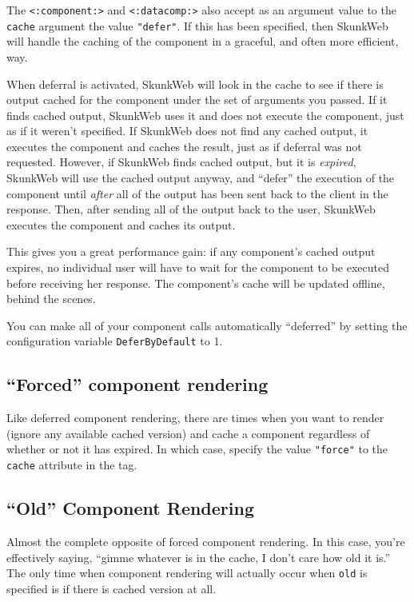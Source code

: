 \documentclass{manual}
\begin{document}
The \texttt{<:component:>} and \texttt{<:datacomp:>} also accept as an
argument value to the \texttt{cache} argument the value
\texttt{"defer"}.  If this has been specified, then SkunkWeb will
handle the caching of the component in a graceful, and often more
efficient, way.

When deferral is activated, SkunkWeb will look in the cache to see if
there is output cached for the component under the set of arguments
you passed. If it finds cached output, SkunkWeb uses it and does not
execute the component, just as if it weren't specified.  If SkunkWeb
does not find any cached output, it executes the component and caches
the result, just as if deferral was not requested. However, if
SkunkWeb finds cached output, but it is \emph{expired}, SkunkWeb will
use the cached output anyway, and ``defer'' the execution of the
component until \emph{after} all of the output has been sent back to
the client in the response.  Then, after sending all of the output
back to the user, SkunkWeb executes the component and caches its
output.

This gives you a great performance gain: if any component's cached
output expires, no individual user will have to wait for the component
to be executed before receiving her response. The component's cache
will be updated offline, behind the scenes.

You can make all of your component calls automatically ``deferred'' by
setting the configuration variable
\texttt{DeferByDefault} to 1.

\subsection{``Forced'' component rendering}
Like deferred component rendering, there are times when you want to
render (ignore any available cached version) and cache a component
regardless of whether or not it has expired.  In which case, specify
the value \texttt{"force"} to the \texttt{cache} attribute in the tag.

\subsection{``Old'' Component Rendering}
Almost the complete opposite of forced component rendering.  In this
case, you're effectively saying, ``gimme whatever is in the cache, I
don't care how old it is.''  The only time when component rendering
will actually occur when \texttt{old} is specified is if there is
 cached version at all.
\end{document}
